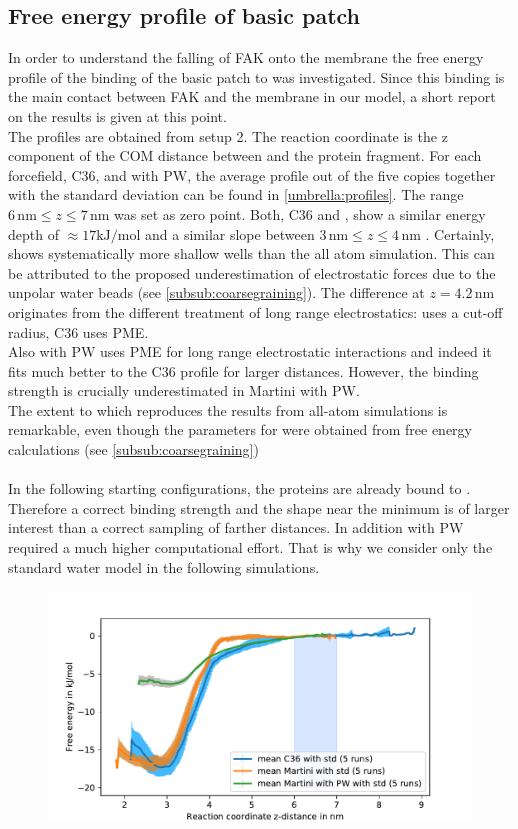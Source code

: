 \subsection{Free energy profile of basic patch}
\label{results:umbrella}
In order to understand the falling of FAK onto the membrane the free energy profile of the binding of the basic patch to \pip{} was investigated. Since this binding is the main contact between FAK and the membrane in our model, a short report on the results is given at this point.\\
The profiles are obtained from setup 2. The reaction coordinate is the z component of the COM distance between \pip{} and the protein fragment. For each forcefield, C36, \martini{} and \martini{} with PW, the average profile out of the five copies together with the standard deviation can be found in \autoref{umbrella:profiles}. The range $6\,\si{\nano\metre} \le z \le 7\,\si{\nano\metre}$ was set as zero point.
Both, C36 and \martini{}, show a similar energy depth of $\approx 17 \si{\kilo\joule/\mole}$ and a similar slope between $3\,\si{\nano\metre} \le z \le 4\,\si{\nano\metre}$ . Certainly, \martini{} shows systematically more shallow wells than the all atom simulation. This can be attributed to the proposed underestimation of electrostatic forces due to the unpolar water beads (see \autoref{subsub:coarsegraining}). The difference at $z = 4.2\,\si{\nano\metre}$ originates from the different treatment of long range electrostatics: \martini{} uses a cut-off radius, C36 uses PME.\\ %
Also \martini{} with PW uses PME for long range electrostatic interactions and indeed it fits much better to the C36 profile for larger distances. However, the binding strength is crucially underestimated in Martini with PW.\\
The extent to which \martini{} reproduces the results from all-atom simulations is remarkable, even though the parameters for \martini{} were obtained from free energy calculations (see \autoref{subsub:coarsegraining})\\
\\
In the following starting configurations, the proteins are already bound to \pip{}. Therefore a correct binding strength and the shape near the minimum is of larger interest than a correct sampling of farther distances. In addition \martini{} with PW required a much higher computational effort. That is why we consider only the standard water model in the following simulations.
%
%
%
\begin{figure}
	\centering
	\includegraphics[width=.8\textwidth]{figures/results/umbrella}
	\label{umbrella:profiles}
\end{figure}
%
%
%
